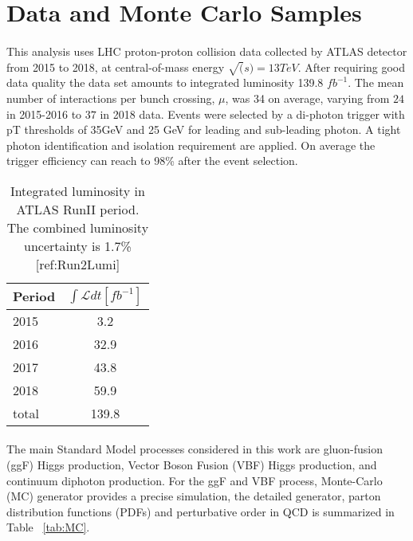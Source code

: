 \section{Data and Monte Carlo Samples}
\label{sec:dataMC}

\paragraph{} This analysis uses LHC proton-proton collision data collected by ATLAS detector from 2015 to 2018, at central-of-mass energy $\sqrt(s)=13TeV$. After requiring good data quality the data set amounts to integrated luminosity 139.8 $fb^{-1}$. The mean number of interactions per bunch crossing, $\mu$, was 34 on average, varying from $24$ in 2015-2016 to $37$ in 2018 data. Events were selected by a di-photon trigger with pT thresholds of 35GeV and 25 GeV for leading and sub-leading photon. A tight photon identification and isolation requirement are applied. On average the trigger efficiency can reach to 98\% after the event selection. 

\begin{table}[htbp]
\centering
\begin{tabular}{l|c}
\hline
Period & $\int \mathcal{L} dt [fb^{-1}]$ \\ \hline
2015   & 3.2                   \\
2016   & 32.9                  \\
2017   & 43.8                  \\
2018   & 59.9                  \\ \hline
total  & 139.8                 \\
\hline
\end{tabular}
\caption{Integrated luminosity in ATLAS RunII period. The combined luminosity uncertainty is 1.7\% [ref:Run2Lumi]}
\label{tab:dataLumi}
\end{table}

\paragraph{} The main Standard Model processes considered in this work are gluon-fusion (ggF) Higgs production, Vector Boson Fusion (VBF) Higgs production, and continuum diphoton production. For the ggF and VBF process, Monte-Carlo (MC) generator provides a precise simulation, the detailed generator, parton distribution functions (PDFs) and perturbative order in QCD is summarized in Table ~\ref{tab:MC}. 

